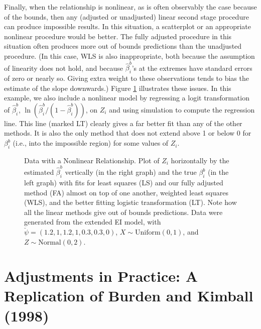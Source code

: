\documentclass[11pt,titlepage]{article}
\begin{document}
Finally, when the relationship is nonlinear, as is often observably
the case because of the bounds, then any (adjusted or unadjusted)
linear second stage procedure can produce impossible results.  In this
situation, a scatterplot or an appropriate nonlinear procedure would
be better.  The fully adjusted procedure in this situation often
produces more out of bounds predictions than the unadjusted procedure.
(In this case, WLS is also inappropriate, both because the assumption
of linearity does not hold, and because $\hat\beta_i^b$'s at the
extremes have standard errors of zero or nearly so.  Giving extra
weight to these observations tends to bias the estimate of the slope
downwards.)  Figure \ref{f:nonlinear} illustrates these issues.  In
this example, we also include a nonlinear model by regressing a logit
transformation of $\hat\beta_i^b$,
$\ln(\hat\beta_i^b/(1-\hat\beta_i^b))$, on $Z_i$ and using simulation
to compute the regression line.  This line (marked LT) clearly gives a
far better fit than any of the other methods.  It is also the only
method that does not extend above 1 or below 0 for $\beta_i^b$ (i.e.,
into the impossible region) for some values of $Z_i$.
\begin{figure}[t]
  \begin{center}
    \caption{Data with a Nonlinear Relationship.  Plot of $Z_i$ 
      horizontally by the estimated $\hat\beta_i^b$ vertically (in the
      right graph) and the true $\beta_i^b$ (in the left graph) with
      fits for least squares (LS) and our fully adjusted method (FA)
      almost on top of one another, weighted least squares (WLS), and
      the better fitting logistic transformation (LT).  Note how all
      the linear methods give out of bounds predictions.  Data were
      generated from the extended EI model, with
      $\breve\psi=(1.2,1,1.2,1,0.3,0.3,0)$, $X \sim \textrm{Uniform}(0,1)$, and
      $Z \sim \textrm{Normal}(0,2)$.}
    \label{f:nonlinear}
  \end{center}
\end{figure}

\section{Adjustments in Practice: A Replication of Burden and Kimball (1998)}
\end{document}
